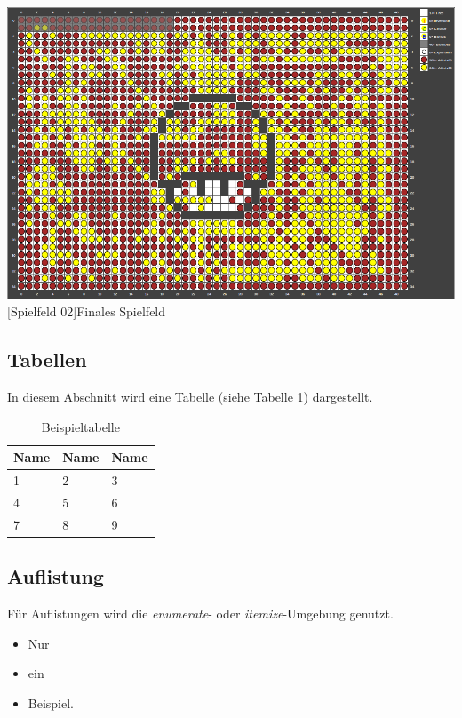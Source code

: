 \documentclass[12pt,a4paper]{article}
\begin{document}
\vspace{1em}
\begin{minipage}{\linewidth}
	\centering
	\includegraphics[width=0.6\linewidth]{pics/gamefield02.png}
	[Spielfeld 02]{Finales Spielfeld\footnotemark }
	\label{fig:reversi2}
\end{minipage}

\subsection{Tabellen}
In diesem Abschnitt wird eine Tabelle (siehe Tabelle \ref{tab:beispiel}) dargestellt.

\vspace{1em}
\begin{table}[!h]
	\centering
	\begin{tabular}{|l|l|l|}
		\hline
		\textbf{Name} & \textbf{Name} & \textbf{Name}\\
		\hline
		1 & 2 & 3\\
		\hline
		4 & 5 & 6\\
		\hline
		7 & 8 & 9\\
		\hline
	\end{tabular}
	\caption{Beispieltabelle}
	\label{tab:beispiel}
\end{table}


\subsection{Auflistung}
Für Auflistungen wird die \textit{enumerate}- oder \textit{itemize}-Umgebung genutzt.

\begin{itemize}
	\item Nur
	\item ein
	\item Beispiel.
\end{itemize}
\end{document}
